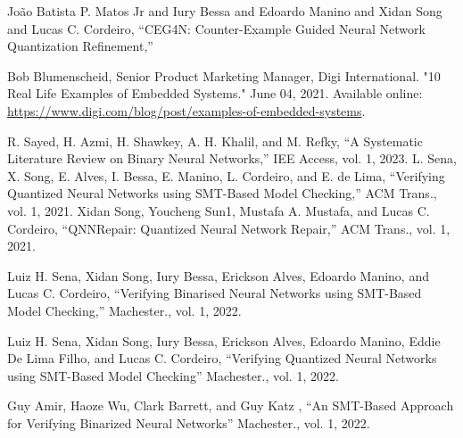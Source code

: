 \documentclass[conference]{IEEEtran}
\begin{document}
\begin{thebibliography}{00}
 { João Batista P. Matos Jr and Iury Bessa and  Edoardo Manino and Xidan Song and Lucas C. Cordeiro, ``CEG4N: Counter-Example Guided Neural Network Quantization Refinement,''}

 {Bob Blumenscheid, Senior Product Marketing Manager, Digi International. "10 Real Life Examples of Embedded Systems." June 04, 2021. Available online: \url{https://www.digi.com/blog/post/examples-of-embedded-systems}}.

 R. Sayed, H. Azmi, H. Shawkey, A. H. Khalil, and M. Refky, ``A Systematic Literature Review on Binary Neural Networks,'' IEE Access, vol. 1, 2023.
 L. Sena, X. Song, E. Alves, I. Bessa, E. Manino, L. Cordeiro, and E. de Lima, ``Verifying Quantized Neural Networks using SMT-Based Model Checking,'' ACM Trans., vol. 1, 2021.
 Xidan Song, Youcheng Sun1, Mustafa
A. Mustafa, and Lucas C.
Cordeiro, ``QNNRepair: Quantized Neural Network Repair,'' ACM Trans., vol. 1, 2021.

 Luiz H. Sena, Xidan Song, Iury Bessa, Erickson Alves, Edoardo Manino, and Lucas C.
Cordeiro, ``Verifying Binarised Neural Networks using SMT-Based Model
Checking,'' Machester., vol. 1, 2022.

 Luiz H. Sena, Xidan Song, Iury Bessa, Erickson Alves, Edoardo Manino, Eddie De Lima Filho, and Lucas C.
Cordeiro, ``Verifying Quantized Neural Networks using SMT-Based
Model Checking'' Machester., vol. 1, 2022.

 Guy Amir, Haoze Wu, Clark Barrett, and Guy Katz , ``An SMT-Based Approach for Verifying
Binarized Neural Networks'' Machester., vol. 1, 2022.


\end{thebibliography}
\end{document}
